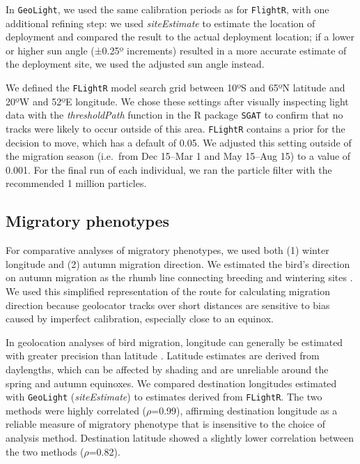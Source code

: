 \documentclass[a4paper, nobind]{templates/ociamthesis}
\begin{document}
In \texttt{GeoLight}, we used the same calibration periods as for \texttt{FlightR}, with one additional refining step: we used \emph{siteEstimate} to estimate the location of deployment and compared the result to the actual deployment location; if a lower or higher sun angle (±0.25º increments) resulted in a more accurate estimate of the deployment site, we used the adjusted sun angle instead.

We defined the \texttt{FLightR} model search grid between 10ºS and 65ºN latitude and 20ºW and 52ºE longitude. We chose these settings after visually inspecting light data with the \emph{thresholdPath} function in the R package \texttt{SGAT} \autocite{lisovskiGeoLightProcessingAnalysing2012,sumnerBayesianEstimationAnimal2009} to confirm that no tracks were likely to occur outside of this area.
\texttt{FLightR} contains a prior for the decision to move, which has a default of 0.05. We adjusted this setting outside of the migration season (i.e.~from Dec 15--Mar 1 and May 15--Aug 15) to a value of 0.001. For the final run of each individual, we ran the particle filter with the recommended 1 million particles.

\hypertarget{migratory-phenotypes}{%
\subsection{Migratory phenotypes}\label{migratory-phenotypes}}

For comparative analyses of migratory phenotypes, we used both (1) winter longitude and (2) autumn migration direction. We estimated the bird's direction on autumn migration as the rhumb line connecting breeding and wintering sites \autocite[\emph{bearingRhumb} in R package \texttt{geosphere},][]{hijmansGeosphereSphericalTrigonometry2017}. We used this simplified representation of the route for calculating migration direction because geolocator tracks over short distances are sensitive to bias caused by imperfect calibration, especially close to an equinox.

In geolocation analyses of bird migration, longitude can generally be estimated with greater precision than latitude \autocite{lisovskiGeolocationLightAccuracy2012,ekstromAdvanceGeolocationLight2004,fudickarTrackingMigratorySongbirds2012}. Latitude estimates are derived from daylengths, which can be affected by shading and are unreliable around the spring and autumn equinoxes. We compared destination longitudes estimated with \texttt{GeoLight} (\emph{siteEstimate}) to estimates derived from \texttt{FLightR}. The two methods were highly correlated (\(\rho\)=0.99), affirming destination longitude as a reliable measure of migratory phenotype that is insensitive to the choice of analysis method. Destination latitude showed a slightly lower correlation between the two methods (\(\rho\)=0.82).
\end{document}
